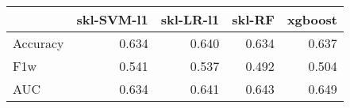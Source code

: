 \begin{tabular}{lrrrr}
\toprule
{} &  skl-SVM-l1 &  skl-LR-l1 &  skl-RF &  xgboost \\
\midrule
Accuracy &       0.634 &      0.640 &   0.634 &    0.637 \\
F1w      &       0.541 &      0.537 &   0.492 &    0.504 \\
AUC      &       0.634 &      0.641 &   0.643 &    0.649 \\
\bottomrule
\end{tabular}
